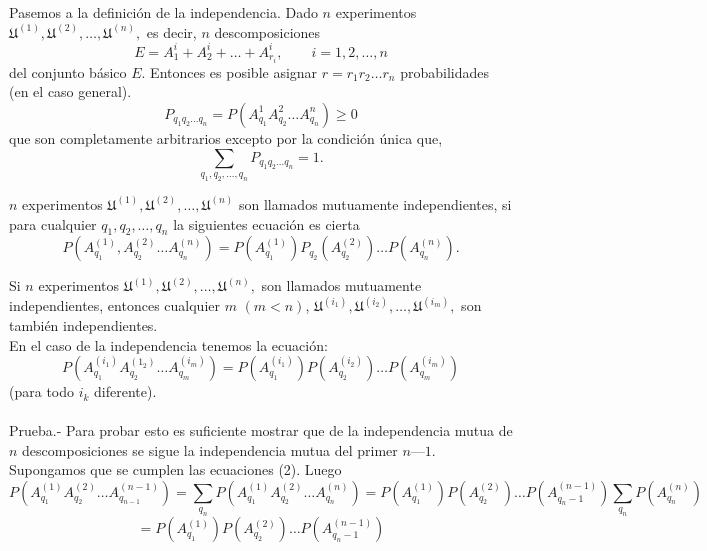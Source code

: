 Pasemos a la definición de la independencia. Dado $n$ experimentos $\mathfrak{U}^{(1)},\mathfrak{U}^{(2)},\ldots,\mathfrak{U}^{(n)},$ es decir, $n$ descomposiciones 
$$E=A_1^{i} +A_2^{i} + \ldots + A_{r_i}^{i}, \qquad i=1,2,\ldots,n$$
del conjunto básico $E$. Entonces es posible asignar $r=r_1 r_2 \ldots r_n$ probabilidades (en el caso general).
$$P_{q_1 q_2 \ldots q_n} = P(A_{q_1}^{1} A_{q_2}^{2} \ldots A_{q_n}^{n}) \geq 0$$
que son completamente arbitrarios excepto por la condición única que,
\begin{equation}
    \sum_{q_1, q_2,\ldots,q_n} P_{q_1 q_2 \ldots q_n} = 1.
\end{equation}

\begin{tcolorbox}[colframe=white]
    \begin{def.} $n$ experimentos $\mathfrak{U}^{(1)}, \mathfrak{U}^{(2)},\ldots,\mathfrak{U}^{(n)}$ son llamados mutuamente independientes, si para cualquier $q_1,q_2,\ldots,q_n$ la siguientes ecuación es cierta
	\begin{equation}
	    P\left(A_{q_1}^{(1)},A_{q_2}^{(2)}\ldots A_{q_n}^{(n)}\right) = P\left(A_{q_1}^{(1)}\right)P_{q_2}\left(A_{q_2}^{(2)}\right)\ldots P\left(A_{q_n}^{(n)}\right). 
	\end{equation}
    \end{def.}
\end{tcolorbox}

\begin{teo}
    Si $n$ experimentos $\mathfrak{U}^{(1)},\mathfrak{U}^{(2)},\ldots,\mathfrak{U}^{(n)},$ son llamados mutuamente independientes, entonces cualquier $m$ $(m<n)$,  $\mathfrak{U}^{(i_1)},\mathfrak{U}^{(i_2)},\ldots,\mathfrak{U}^{(i_m)},$ son también independientes.\\
    En el caso de la independencia tenemos la ecuación:
    \begin{equation}
	P\left(A_{q_1}^{(i_1)} A_{q_2}^{(1_2)} \ldots A_{q_m}^{(i_m)} \right) = P\left(A_{q_1}^{(i_1)}\right)P\left(A_{q_2}^{(i_2)}\right) \ldots P\left(A_{q_m}^{(i_m)}\right)
    \end{equation}
    (para todo $i_k$ diferente).\\\\

    Prueba.-\; Para probar esto es suficiente mostrar que de la independencia mutua de $n$ descomposiciones se sigue la independencia mutua del primer $n — 1$. Supongamos que se cumplen las ecuaciones (2). Luego
    $$P\left(A_{q_1}^{(1)} A_{q_2}^{(2)} \ldots A_{q_{n-1}}^{(n-1)} \right) = \sum\limits_{q_n} P\left(A_{q_1}^{(1)} A_{q_2}^{(2)}\ldots A_{q_n}^{(n)}\right) = P\left(A_{q_1}^{(1)} \right) P\left(A_{q_2}^{(2)}\right)\ldots P\left(A_{q_n-1}^{(n-1)} \right) \sum\limits_{q_n} P\left(A_{q_n}^{(n)}\right)$$ $$ = P\left(A_{q_1}^{(1)} \right) P\left(A_{q_2}^{(2)}\right)\ldots P\left(A_{q_n-1}^{(n-1)} \right)$$\\
\end{teo}

